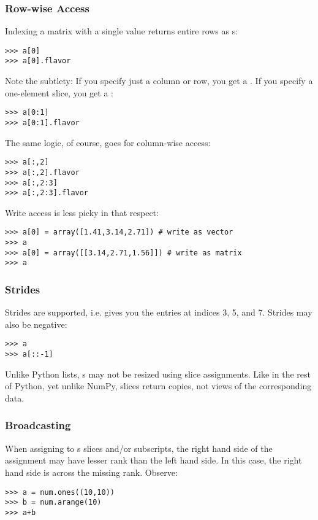 \subsubsection{Row-wise Access}
Indexing a matrix with a single value returns entire rows as s:
\begin{verbatim}
>>> a[0]
>>> a[0].flavor
\end{verbatim}
Note the subtlety: If you specify just a column or row, you get a
.  If you specify a one-element slice, you get a :
\begin{verbatim}
>>> a[0:1]
>>> a[0:1].flavor
\end{verbatim}
The same logic, of course, goes for column-wise access:
\begin{verbatim}
>>> a[:,2]
>>> a[:,2].flavor
>>> a[:,2:3]
>>> a[:,2:3].flavor
\end{verbatim}
Write access is less picky in that respect:
\begin{verbatim}
>>> a[0] = array([1.41,3.14,2.71]) # write as vector
>>> a
>>> a[0] = array([[3.14,2.71,1.56]]) # write as matrix
>>> a
\end{verbatim}
\subsubsection{Strides}
Strides are supported, i.e.  gives you the entries at indices
3, 5, and 7. Strides may also be negative:
\begin{verbatim}
>>> a
>>> a[::-1]
\end{verbatim}
Unlike Python lists, s may not be resized using slice assignments.
Like in the rest of Python, yet unlike NumPy, slices return copies, not views
of the corresponding data.
\subsubsection{Broadcasting}
\label{sssec:write-broadcasting}
When assigning to s slices and/or subscripts, the right hand
side of the assignment may have lesser rank than the left hand side. In this
case, the right hand side is  across the missing
rank. Observe:
\begin{verbatim}
>>> a = num.ones((10,10))
>>> b = num.arange(10)
>>> a+b
\end{verbatim}
